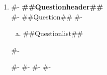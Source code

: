 \documentclass[a4paper]{article}
\begin{document}

\begin{enumerate}
#-
  \item
#-
  \textbf{##Questionheader##}\\
#-
  ##Question##
#-
  \begin{enumerate}[(a)]
    \item ##Questionlist##
  \end{enumerate}
#-

#-
#-
#-
#-
\end{enumerate}
\end{document}
